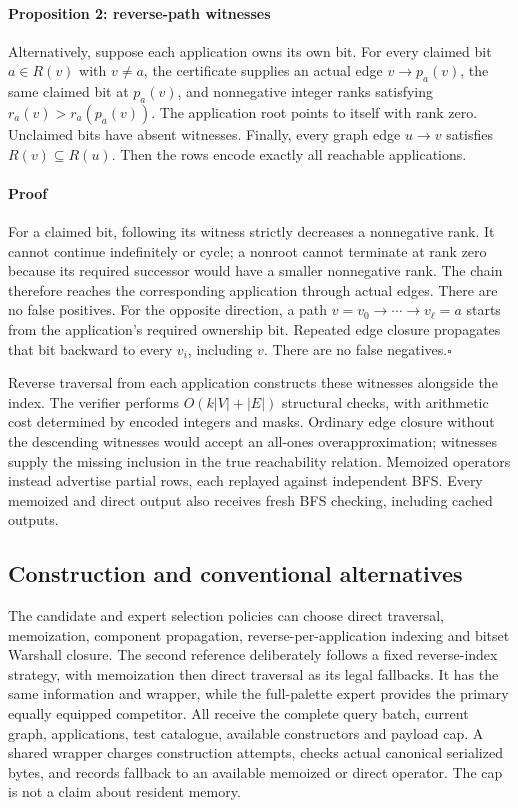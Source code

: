 \paragraph{Proposition 2: reverse-path witnesses}
Alternatively, suppose each application owns its own bit. For every claimed bit $a\in R(v)$ with $v\ne a$, the certificate supplies an actual edge $v\to p_a(v)$, the same claimed bit at $p_a(v)$, and nonnegative integer ranks satisfying $r_a(v)>r_a(p_a(v))$. The application root points to itself with rank zero. Unclaimed bits have absent witnesses. Finally, every graph edge $u\to v$ satisfies $R(v)\subseteq R(u)$. Then the rows encode exactly all reachable applications.

\paragraph{Proof}
For a claimed bit, following its witness strictly decreases a nonnegative rank. It cannot continue indefinitely or cycle; a nonroot cannot terminate at rank zero because its required successor would have a smaller nonnegative rank. The chain therefore reaches the corresponding application through actual edges. There are no false positives. For the opposite direction, a path $v=v_0\to\cdots\to v_\ell=a$ starts from the application's required ownership bit. Repeated edge closure propagates that bit backward to every $v_i$, including $v$. There are no false negatives.\hfill$\square$

Reverse traversal from each application constructs these witnesses alongside the index. The verifier performs $O(k|V|+|E|)$ structural checks, with arithmetic cost determined by encoded integers and masks. Ordinary edge closure without the descending witnesses would accept an all-ones overapproximation; witnesses supply the missing inclusion in the true reachability relation. Memoized operators instead advertise partial rows, each replayed against independent BFS. Every memoized and direct output also receives fresh BFS checking, including cached outputs.

\subsection{Construction and conventional alternatives}

The candidate and expert selection policies can choose direct traversal, memoization, component propagation, reverse-per-application indexing and bitset Warshall closure. The second reference deliberately follows a fixed reverse-index strategy, with memoization then direct traversal as its legal fallbacks. It has the same information and wrapper, while the full-palette expert provides the primary equally equipped competitor. All receive the complete query batch, current graph, applications, test catalogue, available constructors and payload cap. A shared wrapper charges construction attempts, checks actual canonical serialized bytes, and records fallback to an available memoized or direct operator. The cap is not a claim about resident memory.

